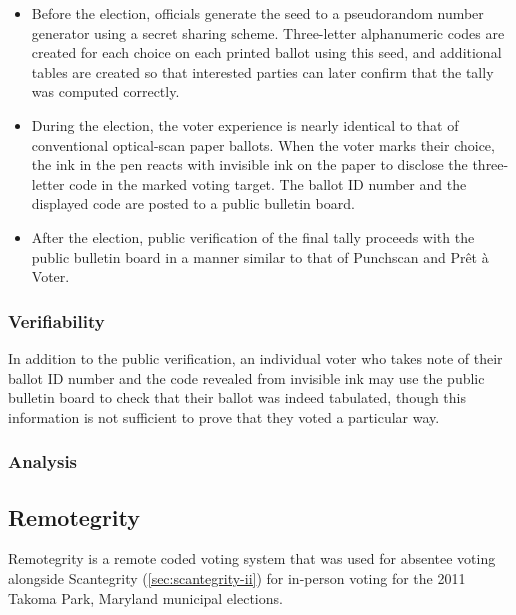 \begin{itemize}

\item Before the election, officials generate the seed to a
  pseudorandom number generator using a secret sharing
  scheme. Three-letter alphanumeric codes are created for each choice
  on each printed ballot using this seed, and additional tables are
  created so that interested parties can later confirm that the tally
  was computed correctly.

\item During the election, the voter experience is nearly identical to
  that of conventional optical-scan paper ballots. When the voter
  marks their choice, the ink in the pen reacts with invisible ink on
  the paper to disclose the three-letter code in the marked voting
  target. The ballot ID number and the displayed code are posted to a
  public bulletin board.

\item After the election, public verification of the final tally
  proceeds with the public bulletin board in a manner similar to that
  of Punchscan and Prêt à Voter.

\end{itemize}
\subsubsection{Verifiability}

In addition to the public verification, an individual voter who takes
note of their ballot ID number and the code revealed from invisible
ink may use the public bulletin board to check that their ballot was
indeed tabulated, though this information is not sufficient to prove
that they voted a particular way.

\subsubsection{Analysis}


\subsection{Remotegrity~\cite{zagorski2013}}
\label{sec:remotegrity}
Remotegrity is a remote coded voting system that was used for absentee
voting alongside Scantegrity (\ref{sec:scantegrity-ii}) for in-person
voting for the 2011 Takoma Park, Maryland municipal elections.


